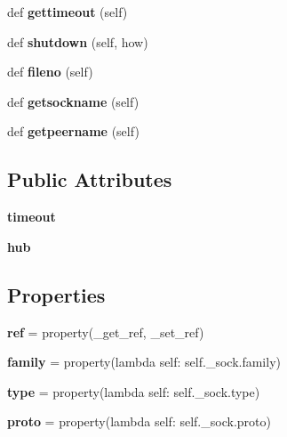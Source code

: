 \begin{DoxyCompactItemize}
def {\bfseries gettimeout} (self)
\item 
\mbox{\label{classgevent_1_1__socket2_1_1socket_a8425c3c4799a35dae6cc912edbb2c2ad}} 
def {\bfseries shutdown} (self, how)
\item 
\mbox{\label{classgevent_1_1__socket2_1_1socket_a9b5fa67e455d40cc3521e4c92257e291}} 
def {\bfseries fileno} (self)
\item 
\mbox{\label{classgevent_1_1__socket2_1_1socket_a79206beab459b073cf104f779c5116d8}} 
def {\bfseries getsockname} (self)
\item 
\mbox{\label{classgevent_1_1__socket2_1_1socket_a54e35e30295259a5cf21bbf64112ae0d}} 
def {\bfseries getpeername} (self)
\end{DoxyCompactItemize}
\subsection*{Public Attributes}
\begin{DoxyCompactItemize}
\item 
\mbox{\label{classgevent_1_1__socket2_1_1socket_ab020761ef5ae9a0f5e4dd4ac40b8d288}} 
{\bfseries timeout}
\item 
\mbox{\label{classgevent_1_1__socket2_1_1socket_a6bc16916fd5dc8b166334a8ea3b97a22}} 
{\bfseries hub}
\end{DoxyCompactItemize}
\subsection*{Properties}
\begin{DoxyCompactItemize}
\item 
\mbox{\label{classgevent_1_1__socket2_1_1socket_a2dff25cc2269781586aedfbfbcc00aab}} 
{\bfseries ref} = property(\+\_\+get\+\_\+ref, \+\_\+set\+\_\+ref)
\item 
\mbox{\label{classgevent_1_1__socket2_1_1socket_afdd686968f7bfacdcc98f6db791b47f4}} 
{\bfseries family} = property(lambda self\+: self.\+\_\+sock.\+family)
\item 
\mbox{\label{classgevent_1_1__socket2_1_1socket_a9b41c30c417698e1288b9835302fd69a}} 
{\bfseries type} = property(lambda self\+: self.\+\_\+sock.\+type)
\item 
\mbox{\label{classgevent_1_1__socket2_1_1socket_a5a82243cf926ec3dcac6a6238a339458}} 
{\bfseries proto} = property(lambda self\+: self.\+\_\+sock.\+proto)
\end{DoxyCompactItemize}


